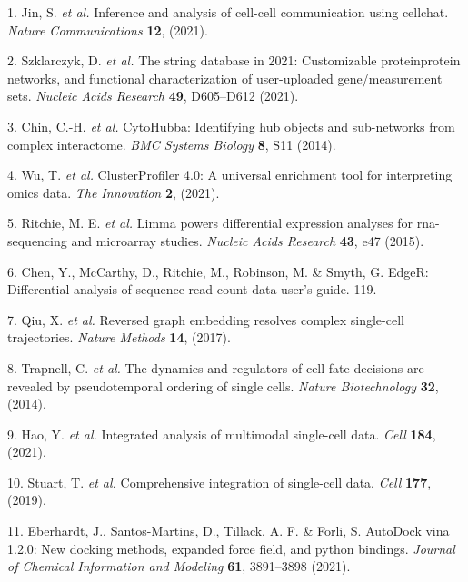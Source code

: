 \documentclass[
]{article}
\newenvironment{cslreferences}%
  {}%
  {\par}
\begin{document}
\hypertarget{refs}{}
\begin{cslreferences}
\leavevmode\hypertarget{ref-InferenceAndAJinS2021}{}%
1. Jin, S. \emph{et al.} Inference and analysis of cell-cell communication using cellchat. \emph{Nature Communications} \textbf{12}, (2021).

\leavevmode\hypertarget{ref-TheStringDataSzklar2021}{}%
2. Szklarczyk, D. \emph{et al.} The string database in 2021: Customizable proteinprotein networks, and functional characterization of user-uploaded gene/measurement sets. \emph{Nucleic Acids Research} \textbf{49}, D605--D612 (2021).

\leavevmode\hypertarget{ref-CytohubbaIdenChin2014}{}%
3. Chin, C.-H. \emph{et al.} CytoHubba: Identifying hub objects and sub-networks from complex interactome. \emph{BMC Systems Biology} \textbf{8}, S11 (2014).

\leavevmode\hypertarget{ref-ClusterprofilerWuTi2021}{}%
4. Wu, T. \emph{et al.} ClusterProfiler 4.0: A universal enrichment tool for interpreting omics data. \emph{The Innovation} \textbf{2}, (2021).

\leavevmode\hypertarget{ref-LimmaPowersDiRitchi2015}{}%
5. Ritchie, M. E. \emph{et al.} Limma powers differential expression analyses for rna-sequencing and microarray studies. \emph{Nucleic Acids Research} \textbf{43}, e47 (2015).

\leavevmode\hypertarget{ref-EdgerDifferenChen}{}%
6. Chen, Y., McCarthy, D., Ritchie, M., Robinson, M. \& Smyth, G. EdgeR: Differential analysis of sequence read count data user's guide. 119.

\leavevmode\hypertarget{ref-ReversedGraphQiuX2017}{}%
7. Qiu, X. \emph{et al.} Reversed graph embedding resolves complex single-cell trajectories. \emph{Nature Methods} \textbf{14}, (2017).

\leavevmode\hypertarget{ref-TheDynamicsAnTrapne2014}{}%
8. Trapnell, C. \emph{et al.} The dynamics and regulators of cell fate decisions are revealed by pseudotemporal ordering of single cells. \emph{Nature Biotechnology} \textbf{32}, (2014).

\leavevmode\hypertarget{ref-IntegratedAnalHaoY2021}{}%
9. Hao, Y. \emph{et al.} Integrated analysis of multimodal single-cell data. \emph{Cell} \textbf{184}, (2021).

\leavevmode\hypertarget{ref-ComprehensiveIStuart2019}{}%
10. Stuart, T. \emph{et al.} Comprehensive integration of single-cell data. \emph{Cell} \textbf{177}, (2019).

\leavevmode\hypertarget{ref-AutodockVina1Eberha2021}{}%
11. Eberhardt, J., Santos-Martins, D., Tillack, A. F. \& Forli, S. AutoDock vina 1.2.0: New docking methods, expanded force field, and python bindings. \emph{Journal of Chemical Information and Modeling} \textbf{61}, 3891--3898 (2021).


\end{cslreferences}
\end{document}
